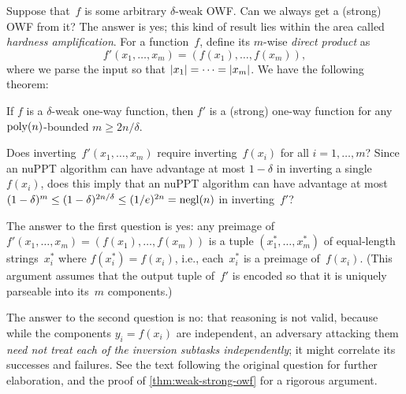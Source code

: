 \documentclass[11pt]{article}
\begin{document}
Suppose that~$f$ is some arbitrary $\delta$-weak OWF.  Can we always
get a (strong) OWF from it?  The answer is yes; this kind of result
lies within the area called \emph{hardness amplification}.  For a
function~$f$, define its $m$-wise \emph{direct product} as
\[ f'(x_{1}, \ldots, x_{m}) = (f(x_{1}), \ldots, f(x_{m})), \] where
we parse the input so that $\lvert x_{1}\rvert = \cdots = \lvert x_{m}\rvert$.  We
have the following theorem:

\begin{theorem}
  \label{thm:weak-strong-owf}
  If $f$ is a $\delta$-weak one-way function, then $f'$ is a (strong)
  one-way function for any $\operatorname{poly}(n)$-bounded $m \geq 2n/\delta$.
\end{theorem}

\begin{question}
  Does inverting~$f'(x_{1}, \ldots, x_{m})$ require
  inverting~$f(x_{i})$ for all $i=1,\ldots,m$?  Since an nuPPT
  algorithm can have advantage at most $1-\delta$ in inverting a
  single~$f(x_{i})$, does this imply that an nuPPT algorithm can have
  advantage at most
  $(1-\delta)^{m} \leq (1-\delta)^{2n/\delta} \leq (1/e)^{2n} =
  \operatorname{negl}(n)$ in inverting~$f'$?
\end{question}

\begin{answer}
  The answer to the first question is yes: any preimage of
  $f'(x_{1}, \ldots, x_{m}) = (f(x_{1}), \ldots, f(x_{m}))$ is a tuple
  $(x_{1}^{*}, \ldots, x_{m}^{*})$ of equal-length strings~$x_{i}^{*}$
  where $f(x_{i}^{*}) = f(x_{i})$, i.e., each~$x_{i}^{*}$ is a
  preimage of~$f(x_{i})$. (This argument assumes that the output
  tuple of~$f'$ is encoded so that it is uniquely parseable into
  its~$m$ components.)

  The answer to the second question is no: that reasoning is not
  valid, because while the components $y_{i} = f(x_{i})$ are
  independent, an adversary attacking them \emph{need not treat each
    of the inversion subtasks independently}; it might correlate its
  successes and failures. See the text following the original question
  for further elaboration, and the proof of
  \cref{thm:weak-strong-owf} for a rigorous argument.
\end{answer}
\end{document}
